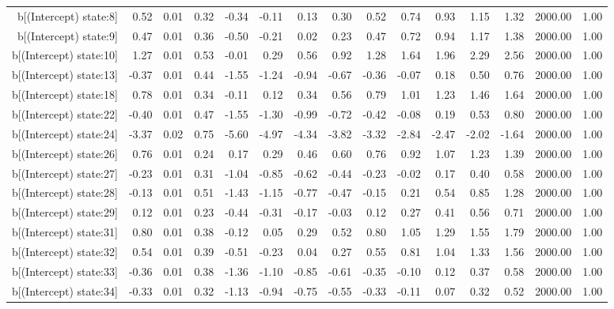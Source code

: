 \begin{table}[ht]
\begin{tabular}{rrrrrrrrrrrrrrr}
  b[(Intercept) state:8] & 0.52 & 0.01 & 0.32 & -0.34 & -0.11 & 0.13 & 0.30 & 0.52 & 0.74 & 0.93 & 1.15 & 1.32 & 2000.00 & 1.00 \\ 
  b[(Intercept) state:9] & 0.47 & 0.01 & 0.36 & -0.50 & -0.21 & 0.02 & 0.23 & 0.47 & 0.72 & 0.94 & 1.17 & 1.38 & 2000.00 & 1.00 \\ 
  b[(Intercept) state:10] & 1.27 & 0.01 & 0.53 & -0.01 & 0.29 & 0.56 & 0.92 & 1.28 & 1.64 & 1.96 & 2.29 & 2.56 & 2000.00 & 1.00 \\ 
  b[(Intercept) state:13] & -0.37 & 0.01 & 0.44 & -1.55 & -1.24 & -0.94 & -0.67 & -0.36 & -0.07 & 0.18 & 0.50 & 0.76 & 2000.00 & 1.00 \\ 
  b[(Intercept) state:18] & 0.78 & 0.01 & 0.34 & -0.11 & 0.12 & 0.34 & 0.56 & 0.79 & 1.01 & 1.23 & 1.46 & 1.64 & 2000.00 & 1.00 \\ 
  b[(Intercept) state:22] & -0.40 & 0.01 & 0.47 & -1.55 & -1.30 & -0.99 & -0.72 & -0.42 & -0.08 & 0.19 & 0.53 & 0.80 & 2000.00 & 1.00 \\ 
  b[(Intercept) state:24] & -3.37 & 0.02 & 0.75 & -5.60 & -4.97 & -4.34 & -3.82 & -3.32 & -2.84 & -2.47 & -2.02 & -1.64 & 2000.00 & 1.00 \\ 
  b[(Intercept) state:26] & 0.76 & 0.01 & 0.24 & 0.17 & 0.29 & 0.46 & 0.60 & 0.76 & 0.92 & 1.07 & 1.23 & 1.39 & 2000.00 & 1.00 \\ 
  b[(Intercept) state:27] & -0.23 & 0.01 & 0.31 & -1.04 & -0.85 & -0.62 & -0.44 & -0.23 & -0.02 & 0.17 & 0.40 & 0.58 & 2000.00 & 1.00 \\ 
  b[(Intercept) state:28] & -0.13 & 0.01 & 0.51 & -1.43 & -1.15 & -0.77 & -0.47 & -0.15 & 0.21 & 0.54 & 0.85 & 1.28 & 2000.00 & 1.00 \\ 
  b[(Intercept) state:29] & 0.12 & 0.01 & 0.23 & -0.44 & -0.31 & -0.17 & -0.03 & 0.12 & 0.27 & 0.41 & 0.56 & 0.71 & 2000.00 & 1.00 \\ 
  b[(Intercept) state:31] & 0.80 & 0.01 & 0.38 & -0.12 & 0.05 & 0.29 & 0.52 & 0.80 & 1.05 & 1.29 & 1.55 & 1.79 & 2000.00 & 1.00 \\ 
  b[(Intercept) state:32] & 0.54 & 0.01 & 0.39 & -0.51 & -0.23 & 0.04 & 0.27 & 0.55 & 0.81 & 1.04 & 1.33 & 1.56 & 2000.00 & 1.00 \\ 
  b[(Intercept) state:33] & -0.36 & 0.01 & 0.38 & -1.36 & -1.10 & -0.85 & -0.61 & -0.35 & -0.10 & 0.12 & 0.37 & 0.58 & 2000.00 & 1.00 \\ 
  b[(Intercept) state:34] & -0.33 & 0.01 & 0.32 & -1.13 & -0.94 & -0.75 & -0.55 & -0.33 & -0.11 & 0.07 & 0.32 & 0.52 & 2000.00 & 1.00 \\ 

\end{tabular}
\end{table}

